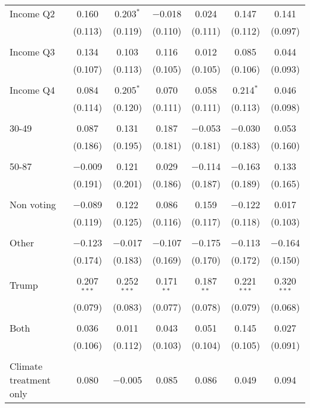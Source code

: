 \begin{tabular}{@{\extracolsep{5pt}}lcccccc}
 Income Q2 & 0.160 & 0.203$^{*}$ & $-$0.018 & 0.024 & 0.147 & 0.141 \\ 
  & (0.113) & (0.119) & (0.110) & (0.111) & (0.112) & (0.097) \\ 
  & & & & & & \\ 
 Income Q3 & 0.134 & 0.103 & 0.116 & 0.012 & 0.085 & 0.044 \\ 
  & (0.107) & (0.113) & (0.105) & (0.105) & (0.106) & (0.093) \\ 
  & & & & & & \\ 
 Income Q4 & 0.084 & 0.205$^{*}$ & 0.070 & 0.058 & 0.214$^{*}$ & 0.046 \\ 
  & (0.114) & (0.120) & (0.111) & (0.111) & (0.113) & (0.098) \\ 
  & & & & & & \\ 
 30-49 & 0.087 & 0.131 & 0.187 & $-$0.053 & $-$0.030 & 0.053 \\ 
  & (0.186) & (0.195) & (0.181) & (0.181) & (0.183) & (0.160) \\ 
  & & & & & & \\ 
 50-87 & $-$0.009 & 0.121 & 0.029 & $-$0.114 & $-$0.163 & 0.133 \\ 
  & (0.191) & (0.201) & (0.186) & (0.187) & (0.189) & (0.165) \\ 
  & & & & & & \\ 
 Non voting & $-$0.089 & 0.122 & 0.086 & 0.159 & $-$0.122 & 0.017 \\ 
  & (0.119) & (0.125) & (0.116) & (0.117) & (0.118) & (0.103) \\ 
  & & & & & & \\ 
 Other & $-$0.123 & $-$0.017 & $-$0.107 & $-$0.175 & $-$0.113 & $-$0.164 \\ 
  & (0.174) & (0.183) & (0.169) & (0.170) & (0.172) & (0.150) \\ 
  & & & & & & \\ 
 Trump & 0.207$^{***}$ & 0.252$^{***}$ & 0.171$^{**}$ & 0.187$^{**}$ & 0.221$^{***}$ & 0.320$^{***}$ \\ 
  & (0.079) & (0.083) & (0.077) & (0.078) & (0.079) & (0.068) \\ 
  & & & & & & \\ 
 Both & 0.036 & 0.011 & 0.043 & 0.051 & 0.145 & 0.027 \\ 
  & (0.106) & (0.112) & (0.103) & (0.104) & (0.105) & (0.091) \\ 
  & & & & & & \\ 
 Climate treatment only & 0.080 & $-$0.005 & 0.085 & 0.086 & 0.049 & 0.094 \\ 

\end{tabular}
